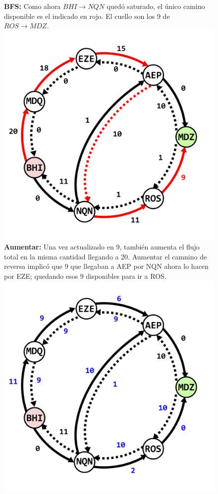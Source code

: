 \documentclass[../tp3_grupo404.tex]{subfiles}
\begin{document}
    \begin{figure}[H]
        \centering
    \subcaptionbox
        {\label{fig:Vuelos7}\textbf{BFS:} Como ahora $BHI\rightarrow NQN$ quedó saturado, el único camino disponible es
        el indicado en rojo. El cuello son los 9 de $ROS\rightarrow MDZ$.}
        {\includegraphics[width=0.4\linewidth,angle=0,origin=c]{out/ejA7.png}}
    \subcaptionbox
        {\label{fig:Vuelos8}\textbf{Aumentar:} Una vez actualizado en 9, también aumenta el flujo total en la misma cantidad
        llegando a 20. Aumentar el camnino de reversa implicó que 9 que llegaban a AEP por NQN ahora lo hacen por EZE; quedando
        esos 9 disponibles para ir a ROS.}
        {\includegraphics[width=0.4\linewidth,angle=0,origin=c]{out/ejA8.png}}
    \end{figure}
\end{document}
